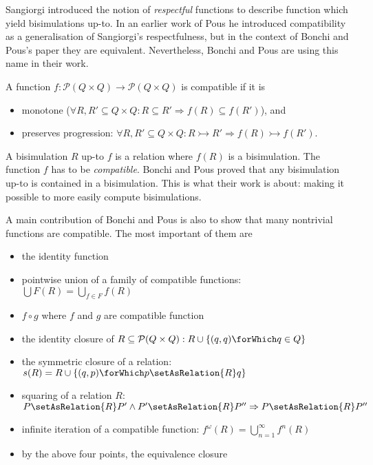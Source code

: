Sangiorgi introduced the notion of \textit{respectful} functions to describe
function which yield bisimulations up-to.
In an earlier work of Pous he introduced compatibility as a generalisation of
Sangiorgi's respectfulness\cite{pous2007complete}, but in the context of Bonchi and Pous's paper they
are equivalent. Nevertheless, Bonchi and Pous are using this name in their work.

\begin{definition}
  A function $f : \mathcal{P}(Q \times Q) \to \mathcal{P}(Q \times Q)$ is compatible if it is
  \begin{itemize}
    \item monotone ($\forall R, R' \subseteq Q \times Q: R \subseteq R' \Rightarrow f(R) \subseteq f(R')$), and
    \item preserves progression:
        $\forall R, R' \subseteq Q \times Q: R \rightarrowtail R' \Rightarrow f(R) \rightarrowtail f(R')$.
  \end{itemize}
\end{definition}

A bisimulation $R$ up-to $f$ is a relation where $f(R)$ is a bisimulation.
The function $f$ has to be \textit{compatible}. Bonchi and Pous proved that
any bisimulation up-to is contained in a bisimulation. This is what their
work is about: making it possible to more easily compute bisimulations.

A main contribution of Bonchi and Pous is also to show that many nontrivial functions
are compatible. The most important of them are

\begin{itemize}
  \item the identity function
  \item pointwise union of a family of compatible functions: \\
          $\bigcup F(R) = \bigcup_{f \in F} f(R)$
  \item $f \circ g$ where $f$ and $g$ are compatible function
  \item the identity closure of $R \subseteq \mathcal{P}(Q \times Q): R \cup \{(q, q)\forWhich q \in Q\}$
  \item the symmetric closure of a relation: $s(R) = R \cup \{(q, p) \forWhich p \setAsRelation{R} q\}$
  \item squaring of a relation $R$: $P \setAsRelation{R} P' \land P' \setAsRelation{R} P'' \Rightarrow P \setAsRelation{R} P''$
  \item infinite iteration of a compatible function: $f^\omega(R) = \bigcup_{n = 1}^{\infty} f^n(R)$
  \item by the above four points, the equivalence closure
\end{itemize}

